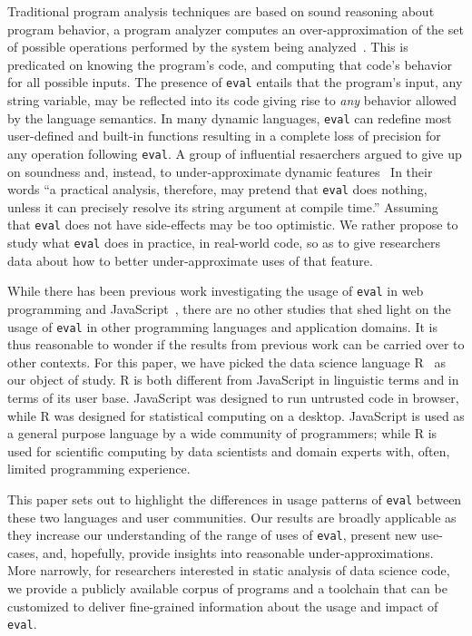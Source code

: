 \documentclass[USenglish,cleveref, autoref, thm-restate]{lipics-v2019}
\newcommand{\eval}{\texttt{eval}\xspace}
\begin{document}
Traditional program analysis techniques are based on sound reasoning about
program behavior, a program analyzer computes an over-approximation of the
set of possible operations performed by the system being
analyzed~\cite{cc77}.  This is predicated on knowing the program's code, and
computing that code's behavior for all possible inputs. The presence of
\eval entails that the program's input, any string variable, may be
reflected into its code giving rise to \emph{any} behavior allowed by the
language semantics. In many dynamic languages, \eval can redefine most
user-defined and built-in functions resulting in a complete loss of
precision for any operation following \eval. A group of influential
resaerchers argued to give up on soundness and, instead, to
under-approximate dynamic features~\cite{soundy} In their words ``a
practical analysis, therefore, may pretend that \eval does nothing, unless
it can precisely resolve its string argument at compile time.''  Assuming
that \eval does not have side-effects may be too optimistic. We rather
propose to study what \eval does in practice, in real-world code, so as to
give researchers data about how to better under-approximate uses of that
feature.

While there has been previous work investigating the usage of \eval in web
programming and JavaScript~\cite{ecoop11}, there are no other studies that
shed light on the usage of \eval in other programming languages and
application domains.  It is thus reasonable to wonder if the results from
previous work can be carried over to other contexts. For this paper, we have
picked the data science language R~\cite{r} as our object of study. R is
both different from JavaScript in linguistic terms and in terms of its user
base. JavaScript was designed to run untrusted code in browser, while R was
designed for statistical computing on a desktop. JavaScript is used as a
general purpose language by a wide community of programmers; while R is used
for scientific computing by data scientists and domain experts with, often,
limited programming experience.

This paper sets out to highlight the differences in usage patterns of \eval
between these two languages and user communities. Our results are broadly
applicable as they increase our understanding of the range of uses of \eval,
present new use-cases, and, hopefully, provide insights into reasonable
under-approximations. More narrowly, for researchers interested in static
analysis of data science code, we provide a publicly available corpus of
programs and a toolchain that can be customized to deliver fine-grained
information about the usage and impact of \eval.
\end{document}
